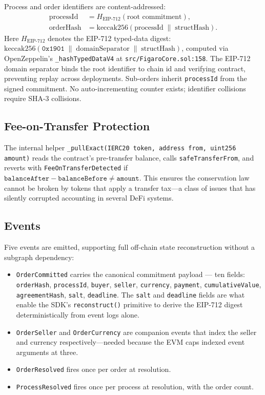 \documentclass[11pt,a4paper]{article}
\theoremstyle{definition}
\theoremstyle{remark}
\begin{document}
Process and order identifiers are content-addressed:
\begin{align}
  \text{processId} &= H_{\text{EIP-712}}(\text{root commitment}), \\
  \text{orderHash} &= \mathrm{keccak256}(\text{processId} \;\|\; \text{structHash}).
\end{align}
Here $H_{\text{EIP-712}}$ denotes the EIP-712 typed-data digest:
$\mathrm{keccak256}(\texttt{0x1901} \;\|\; \text{domainSeparator}
\;\|\; \text{structHash})$, computed via OpenZeppelin's
\texttt{\_hashTypedDataV4} at \texttt{src/FigaroCore.sol:158}.
The EIP-712 domain separator binds the root identifier to chain id
and verifying contract, preventing replay across deployments. Sub-orders
inherit \texttt{processId} from the signed commitment. No
auto-incrementing counter exists; identifier collisions require
SHA-3 collisions.

\subsection{Fee-on-Transfer Protection}

The internal helper \texttt{\_pullExact(IERC20 token, address from,
uint256 amount)} reads the contract's pre-transfer balance, calls
\texttt{safeTransferFrom}, and reverts with
\texttt{FeeOnTransferDetected} if
$\texttt{balanceAfter} - \texttt{balanceBefore} \neq
\texttt{amount}$. This ensures the conservation law cannot be broken
by tokens that apply a transfer tax---a class of issues that has
silently corrupted accounting in several DeFi systems.

\subsection{Events}

Five events are emitted, supporting full off-chain state
reconstruction without a subgraph dependency:

\begin{itemize}
  \item \texttt{OrderCommitted} carries the canonical commitment
    payload --- ten fields:
    \texttt{orderHash}, \texttt{processId}, \texttt{buyer},
    \texttt{seller}, \texttt{currency}, \texttt{payment},
    \texttt{cumulativeValue}, \texttt{agreementHash},
    \texttt{salt}, \texttt{deadline}. The \texttt{salt} and
    \texttt{deadline} fields are what enable the SDK's
    \texttt{reconstruct()} primitive to derive the EIP-712 digest
    deterministically from event logs alone.
  \item \texttt{OrderSeller} and \texttt{OrderCurrency} are
    companion events that index the seller and currency
    respectively---needed because the EVM caps indexed event
    arguments at three.
  \item \texttt{OrderResolved} fires once per order at resolution.
  \item \texttt{ProcessResolved} fires once per process at
    resolution, with the order count.
\end{itemize}
\end{document}
